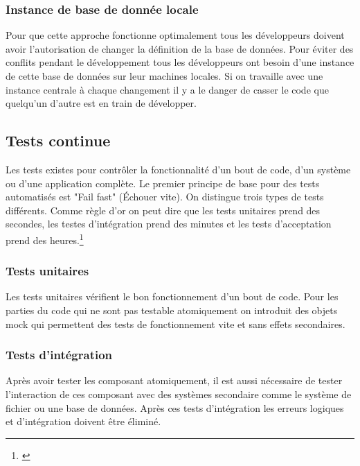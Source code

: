 

\subsubsection{Instance de base de donnée locale}

Pour que cette approche fonctionne optimalement tous les développeurs doivent avoir l'autorisation de changer la définition de la base de données. Pour éviter des conflits pendant le développement tous les développeurs ont besoin d'une instance de cette base de données sur leur machines locales. Si on travaille avec une instance centrale à chaque changement il y a le danger de casser le code que quelqu'un d'autre est en train de développer.
\newpage


\subsection{Tests continue}
Les tests existes pour contrôler la fonctionnalité d'un bout de code, d'un système ou d'une application complète. Le premier principe de base pour des tests automatisés est "Fail fast" (Échouer vite). On distingue trois types de tests différents. Comme règle d'or on peut dire que les tests unitaires prend des secondes, les testes d'intégration prend des minutes et les tests d'acceptation prend des heures.\footnote{\citep{artofunittesting}}

\subsubsection{Tests unitaires}
Les tests unitaires vérifient le bon fonctionnement d'un bout de code. Pour les parties du code qui ne sont pas testable atomiquement on introduit des objets mock qui permettent des tests de fonctionnement vite et sans effets secondaires. 
\subsubsection{Tests d'intégration}
Après avoir tester les composant atomiquement, il est aussi nécessaire de tester l'interaction de ces composant avec des systèmes secondaire comme le système de fichier ou une base de données. Après ces tests d'intégration les erreurs logiques et d'intégration doivent être éliminé.
